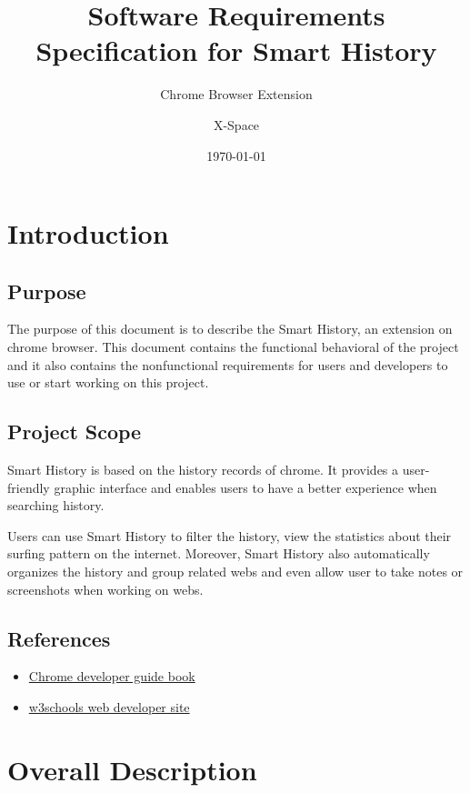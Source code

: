 \documentclass[a5paper]{scrreprt}
\begin{document}
\title{Software Requirements Specification for Smart History}
\subtitle{Chrome Browser Extension}
\date{\today}
\author{X-Space}

\maketitle

\tableofcontents

\chapter{Introduction}

\section{Purpose}

The purpose of this document is to describe the Smart History, an extension on 
chrome browser. This document contains the functional behavioral of the project 
and it also contains the nonfunctional requirements for users and developers to 
use or start working on this project.

\section{Project Scope}

Smart History is based on the history records of chrome. It provides a 
user-friendly graphic interface and enables users to have a better experience when 
searching history.

Users can use Smart History to filter the history, view the statistics about their
surfing pattern on the internet. Moreover, Smart History also automatically 
organizes the history and group related webs and even allow user to take notes or 
screenshots when working on webs.

\section{References}

\begin{itemize}
	\item \href{https://developer.chrome.com/extensions}{Chrome developer guide book}
	\item \href{http://www.w3schools.com/}{w3schools web developer site}
\end{itemize}


\chapter{Overall Description}
\end{document}
